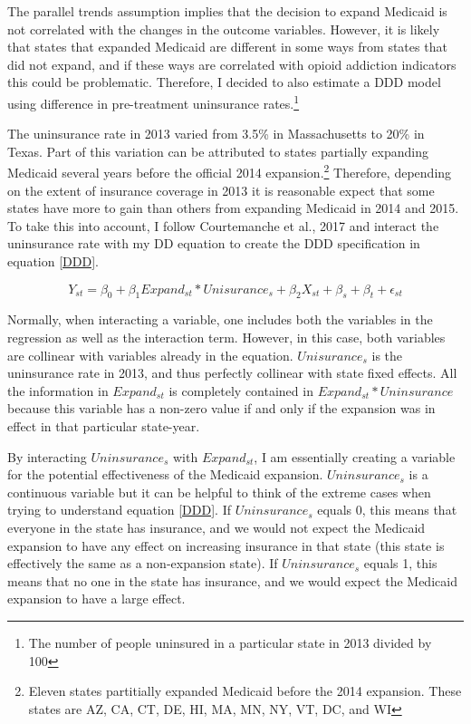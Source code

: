 \documentclass[11pt]{article}
\begin{document}
The parallel trends assumption implies that the decision to expand Medicaid is not correlated with the changes in the outcome variables.  However, it is likely that states that expanded Medicaid are different in some ways from states that did not expand, and if these ways are correlated with opioid addiction indicators this could be problematic.  Therefore, I decided to also estimate a DDD model using difference in pre-treatment uninsurance rates.\footnote{The number of people uninsured in a particular state in 2013 divided by 100}   


The uninsurance rate in 2013 varied from 3.5\% in  Massachusetts to 20\% in Texas.  Part of this variation can be attributed to states partially expanding Medicaid several years before the official 2014 expansion.\footnote{Eleven states partitially expanded Medicaid before the 2014 expansion.  These states are AZ, CA, CT, DE, HI, MA, MN, NY, VT, DC, and WI}  Therefore, depending on the extent of insurance coverage in 2013 it is reasonable expect that some states have more to gain than others from expanding Medicaid in 2014 and 2015. To take this into account, I follow Courtemanche et al., 2017 and interact the uninsurance rate with my DD equation to create the DDD specification in equation \ref{DDD}.  

\begin{equation}
    Y_{st}=\beta_0+ \beta_1 Expand_{st}*Unisurance_s+\beta_2 X_{st} + \beta_s + \beta_t + \epsilon_{st}
     \label{DDD}
\end{equation}

Normally, when interacting a variable, one includes both the variables in the regression as well as the interaction term.  However, in this case, both variables are collinear with variables already in the equation.  $Unisurance_s$ is the uninsurance rate in 2013, and thus perfectly collinear with state fixed effects.  All the information in $Expand_{st}$ is completely contained in $Expand_{st}*Uninsurance$ because this variable has a non-zero value if and only if the expansion was in effect in that particular state-year.  

By interacting $Uninsurance_s$ with $Expand_{st}$, I am essentially creating a variable for the potential effectiveness of the Medicaid expansion.  $Uninsurance_s$ is a continuous variable but it can be helpful to think of the extreme cases when trying to understand equation \ref{DDD}.  If $Uninsurance_s$ equals 0, this means that everyone in the state has insurance, and we would not expect the Medicaid expansion to have any effect on increasing insurance in that state (this state is effectively the same as a non-expansion state).  If $Uninsurance_s$ equals 1, this means that no one in the state has insurance, and we would expect the Medicaid expansion to have a large effect.  
\end{document}
